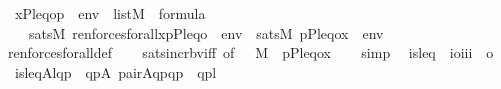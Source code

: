 \begin{isabellebody}
\ \ {\isachardoublequoteopen}{\isacharbrackleft}{\kern0pt}x{\isacharcomma}{\kern0pt}P{\isacharcomma}{\kern0pt}leq{\isacharcomma}{\kern0pt}o{\isacharcomma}{\kern0pt}p{\isacharbrackright}{\kern0pt}\ {\isacharat}{\kern0pt}\ env\ {\isasymin}\ list{\isacharparenleft}{\kern0pt}M{\isacharparenright}{\kern0pt}\ {\isasymLongrightarrow}\ {\isasymphi}{\isasymin}formula\ {\isasymLongrightarrow}\isanewline
\ \ \ \ sats{\isacharparenleft}{\kern0pt}M{\isacharcomma}{\kern0pt}\ ren{\isacharunderscore}{\kern0pt}forces{\isacharunderscore}{\kern0pt}forall{\isacharparenleft}{\kern0pt}{\isasymphi}{\isacharparenright}{\kern0pt}{\isacharcomma}{\kern0pt}{\isacharbrackleft}{\kern0pt}x{\isacharcomma}{\kern0pt}p{\isacharcomma}{\kern0pt}P{\isacharcomma}{\kern0pt}leq{\isacharcomma}{\kern0pt}o{\isacharbrackright}{\kern0pt}\ {\isacharat}{\kern0pt}\ env{\isacharparenright}{\kern0pt}\ {\isasymlongleftrightarrow}\ sats{\isacharparenleft}{\kern0pt}M{\isacharcomma}{\kern0pt}\ {\isasymphi}{\isacharcomma}{\kern0pt}{\isacharbrackleft}{\kern0pt}p{\isacharcomma}{\kern0pt}P{\isacharcomma}{\kern0pt}leq{\isacharcomma}{\kern0pt}o{\isacharcomma}{\kern0pt}x{\isacharbrackright}{\kern0pt}\ {\isacharat}{\kern0pt}\ env{\isacharparenright}{\kern0pt}{\isachardoublequoteclose}\isanewline
%
\isadelimproof
\ \ %
\endisadelimproof
%
\isatagproof
{}\isamarkupfalse%
\ ren{\isacharunderscore}{\kern0pt}forces{\isacharunderscore}{\kern0pt}forall{\isacharunderscore}{\kern0pt}def\isanewline
\ \ \isamarkupfalse%
\ sats{\isacharunderscore}{\kern0pt}incr{\isacharunderscore}{\kern0pt}bv{\isacharunderscore}{\kern0pt}iff\ {\isacharbrackleft}{\kern0pt}of\ {\isacharunderscore}{\kern0pt}\ {\isacharunderscore}{\kern0pt}\ M\ {\isacharunderscore}{\kern0pt}\ {\isachardoublequoteopen}{\isacharbrackleft}{\kern0pt}p{\isacharcomma}{\kern0pt}P{\isacharcomma}{\kern0pt}leq{\isacharcomma}{\kern0pt}o{\isacharcomma}{\kern0pt}x{\isacharbrackright}{\kern0pt}{\isachardoublequoteclose}{\isacharbrackright}{\kern0pt}\isanewline
\ \ \isamarkupfalse%
\ simp%
\endisatagproof
{\isafoldproof}%
%
\isadelimproof
\isanewline
%
\endisadelimproof
\isanewline
\isanewline
{}\isamarkupfalse%
\isanewline
\ \ is{\isacharunderscore}{\kern0pt}leq\ {\isacharcolon}{\kern0pt}{\isacharcolon}{\kern0pt}\ {\isachardoublequoteopen}{\isacharbrackleft}{\kern0pt}i{\isasymRightarrow}o{\isacharcomma}{\kern0pt}i{\isacharcomma}{\kern0pt}i{\isacharcomma}{\kern0pt}i{\isacharbrackright}{\kern0pt}\ {\isasymRightarrow}\ o{\isachardoublequoteclose}\ \isanewline
\ \ {\isachardoublequoteopen}is{\isacharunderscore}{\kern0pt}leq{\isacharparenleft}{\kern0pt}A{\isacharcomma}{\kern0pt}l{\isacharcomma}{\kern0pt}q{\isacharcomma}{\kern0pt}p{\isacharparenright}{\kern0pt}\ {\isasymequiv}\ {\isasymexists}qp{\isacharbrackleft}{\kern0pt}A{\isacharbrackright}{\kern0pt}{\isachardot}{\kern0pt}\ {\isacharparenleft}{\kern0pt}pair{\isacharparenleft}{\kern0pt}A{\isacharcomma}{\kern0pt}q{\isacharcomma}{\kern0pt}p{\isacharcomma}{\kern0pt}qp{\isacharparenright}{\kern0pt}\ {\isasymand}\ qp{\isasymin}l{\isacharparenright}{\kern0pt}{\isachardoublequoteclose}\isanewline

\end{isabellebody}
